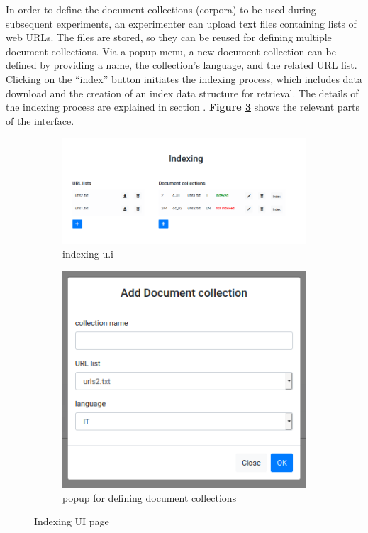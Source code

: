 \documentclass[a4paper]{usiinfbachelorproject}
\begin{document}
In order to define the document collections (corpora) to be used during subsequent experiments, 
an experimenter can upload text files containing lists of web URLs. The files are  stored, so they can be reused 
for defining multiple document collections. Via a popup menu, a new  document collection can be defined by providing a name, 
the collection's language, and the related URL list.
Clicking on the ``index'' button initiates the indexing process, which includes data download and the creation of an index
data structure for retrieval. The details of the indexing process are explained in section .
\textbf{Figure \ref{fig:indexing}} shows the relevant parts of the interface.

\begin{figure}[h]
     
     \centering
     \begin{subfigure}[b]{0.6\textwidth}
         \centering
         \includegraphics[width=.8\linewidth]{figures/indexing1}
         \caption{indexing  u.i}
         \label{fig:indexingA}
     \end{subfigure}
     \begin{subfigure}[b]{0.3\textwidth}
         \centering
         \includegraphics[width=.6\linewidth]{figures/indexing2}
         \caption{popup for defining  document collections}
         \label{fig:indexingB}
     \end{subfigure}
     \caption{Indexing UI page}
     \label{fig:indexing}

\end{figure}
\end{document}
